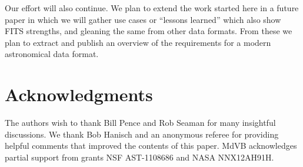 \documentclass[final,authoryear,5p,times,twocolumn]{elsarticle}
\begin{document}
{{Our effort will also continue. We plan to extend the work started
here in a future paper in which we will gather use cases or ``lessons learned''
which also show FITS strengths, and gleaning the same from other data formats.
From these we plan to extract and publish an overview of the requirements for
a modern astronomical data format.




\section{Acknowledgments}

The authors wish to thank Bill Pence and Rob Seaman for many insightful
discussions.  We thank Bob Hanisch and an anonymous referee for providing
helpful comments that improved the contents of this paper.
MdVB acknowledges partial support from grants NSF AST-1108686 and NASA
NNX12AH91H.




}}
\end{document}
